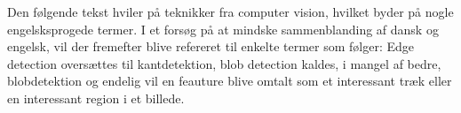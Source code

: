 \textsf{
Den følgende tekst hviler på teknikker fra computer vision, hvilket byder
på nogle engelsksprogede termer. I et forsøg på at mindske sammenblanding
af dansk og engelsk, vil der fremefter blive refereret til enkelte termer
som følger: Edge detection oversættes til kantdetektion, blob detection
kaldes, i mangel af bedre, blobdetektion og endelig vil en feauture blive
omtalt som et interessant træk eller en interessant region i et billede.
}
